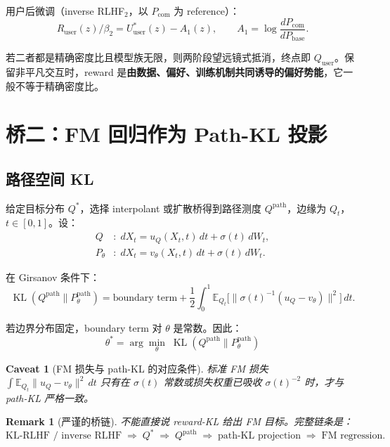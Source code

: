 \documentclass[11pt,a4paper]{article}
\newtheorem{remark}[theorem]{Remark}
\newtheorem{caveat}[theorem]{Caveat}
\DeclareMathOperator{\KL}{KL}
\newcommand{\E}{\mathbb{E}}
\begin{document}
用户后微调（inverse RLHF$_2$，以 $P_{\text{com}}$ 为 reference）：
\begin{equation}\label{eq:U_user}
R_{\text{user}}(z)/\beta_2 = U_{\text{user}}^*(z) - A_1(z),\qquad A_1 = \log\frac{dP_{\text{com}}}{dP_{\text{base}}}.
\end{equation}

若二者都是精确密度比且模型族无限，则两阶段望远镜式抵消，终点即 $Q_{\text{user}}$。保留非平凡交互时，reward 是\textbf{由数据、偏好、训练机制共同诱导的偏好势能}，它一般不等于精确密度比。

\section{桥二：FM 回归作为 Path-KL 投影}
\label{sec:path_kl}

\subsection{路径空间 KL}

给定目标分布 $Q^*$，选择 interpolant 或扩散桥得到路径测度 $Q^{\text{path}}$，边缘为 $Q_t$，$t\in[0,1]$。设：
\begin{align}
Q &:\; dX_t = u_Q(X_t,t)\,dt + \sigma(t)\,dW_t, \\
P_\theta &:\; dX_t = v_\theta(X_t,t)\,dt + \sigma(t)\,dW_t.
\end{align}

在 Girsanov 条件下：
\begin{equation}\label{eq:path_kl}
\KL(Q^{\text{path}}\|P_\theta^{\text{path}}) = \text{boundary term} + \frac{1}{2}\int_0^1 \E_{Q_t}\!\bigl[\|\sigma(t)^{-1}(u_Q - v_\theta)\|^2\bigr]\,dt.
\end{equation}

若边界分布固定，boundary term 对 $\theta$ 是常数。因此：
\begin{equation}\label{eq:fm_as_kl}
\boxed{
\theta^* = \arg\min_\theta\;\KL(Q^{\text{path}}\|P_\theta^{\text{path}})
}
\end{equation}

\begin{caveat}[FM 损失与 path-KL 的对应条件]
标准 FM 损失 $\int \E_{Q_t}\|u_Q - v_\theta\|^2\,dt$ 只有在 $\sigma(t)$ 常数或损失权重已吸收 $\sigma(t)^{-2}$ 时，才与 path-KL 严格一致。
\end{caveat}

\begin{remark}[严谨的桥链]
不能直接说 reward-KL 给出 FM 目标。完整链条是：
\[
\text{KL-RLHF / inverse RLHF} \;\Rightarrow\; Q^* \;\Rightarrow\; Q^{\text{path}} \;\Rightarrow\; \text{path-KL projection} \;\Rightarrow\; \text{FM regression}.
\]
\end{remark}
\end{document}
